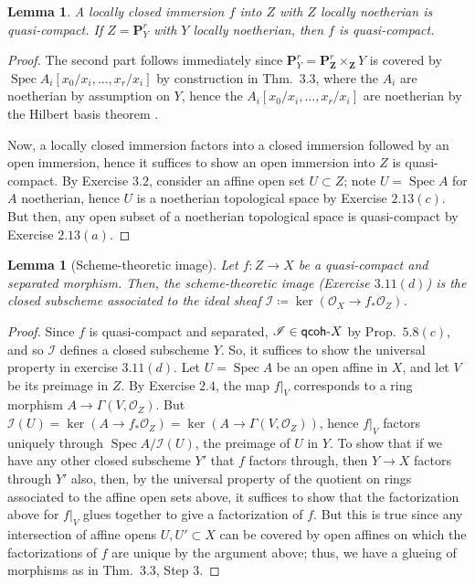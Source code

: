 \documentclass[10pt]{article}
\newtheorem{lemma}[subsubsection]{Lemma}
\theoremstyle{definition}
\theoremstyle{remark}
\numberwithin{equation}{section}
\numberwithin{figure}{subsubsection}
\DeclareMathOperator{\Spec}{Spec}
\newcommand{\II}{\mathscr{I}}
\newcommand{\OO}{\mathcal{O}}
\newcommand{\qcoh}{\mathsf{qcoh}\mathchar`-}
\begin{document}
\begin{lemma}\label{locnoethimm}
  A locally closed immersion $f$ into $Z$ with $Z$ locally noetherian is quasi-compact. If $Z = \mathbf{P}^r_Y$ with $Y$ locally noetherian, then $f$ is quasi-compact.
\end{lemma}
\begin{proof}
  The second part follows immediately since $\mathbf{P}^r_Y = \mathbf{P}^r_{\mathbf{Z}} \times_{\mathbf{Z}} Y$ is covered by $\Spec A_i[x_0/x_i,\ldots,x_r/x_i]$ by construction in Thm.~3.3, where the $A_i$ are noetherian by assumption on $Y$, hence the $A_i[x_0/x_i,\ldots,x_r/x_i]$ are noetherian by the Hilbert basis theorem \cite[Thm.~7.5]{AM69}.
  \par Now, a locally closed immersion factors into a closed immersion followed
  by an open immersion, hence it suffices to show an open immersion into $Z$ is
  quasi-compact. By Exercise $3.2$, consider an affine open set $U \subset Z$;
  note $U = \Spec A$ for $A$ noetherian, hence $U$ is a noetherian topological
  space by Exercise $2.13(c)$. But then, any open subset of a noetherian
  topological space is quasi-compact by Exercise $2.13(a)$.
\end{proof}
\begin{lemma}[Scheme-theoretic image]\label{stimg}
  Let $f \colon Z \to X$ be a quasi-compact and separated morphism. Then, the
  scheme-theoretic image \emph{(Exercise $3.11(d)$)} is the closed subscheme associated to the ideal sheaf $\II \coloneqq \ker(\OO_X \to f_*\OO_Z)$.
\end{lemma}
\begin{proof}
  Since $f$ is quasi-compact and separated, $\II \in \qcoh X$ by Prop.~$5.8(c)$,
  and so $\II$ defines a closed subscheme $Y$. So, it suffices to show the
  universal property in exercise $3.11(d)$. Let $U = \Spec A$ be an open affine
  in $X$, and let $V$ be its preimage in $Z$. By Exercise $2.4$, the map $f\vert_V$ corresponds to a ring morphism $A \to \Gamma(V,\OO_Z)$. But $\II(U) = \ker(A \to f_*\OO_Z) = \ker(A \to \Gamma(V,\OO_Z))$, hence $f\vert_V$ factors uniquely through $\Spec A/\II(U)$, the preimage of $U$ in $Y$. To show that if we have any other closed subscheme $Y'$ that $f$ factors through, then $Y \to X$ factors through $Y'$ also, then, by the universal property of the quotient on rings associated to the affine open sets above, it suffices to show that the factorization above for $f\vert_V$ glues together to give a factorization of $f$. But this is true since any intersection of affine opens $U,U' \subset X$ can be covered by open affines on which the factorizations of $f$ are unique by the argument above; thus, we have a glueing of morphisms as in Thm.~3.3, Step 3.
\end{proof}
\end{document}
